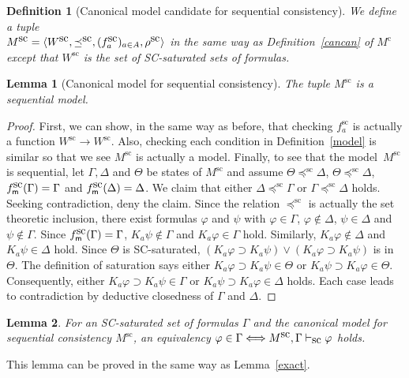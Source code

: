 \documentclass[doctor]{iscs-thesis}
\newcommand{\vdashsc}{\vdash_{\mbox{\rm sc}}}
\newcommand{\memory}{{\sf m}}
\newtheorem{definition}{Definition}
\newtheorem{lemma}{Lemma}
\begin{document}
\renewcommand{\canon}[1]{#1^{\mbox{sc}}}
\begin{definition}[Canonical model candidate for sequential consistency]
 We define a tuple\\ $\canon M =\model{^{\mbox{\rm sc}}}$ in the same
 way as Definition~\ref{cancan} of $M^{\mbox{c}}$ except that 
 $\canon W$ is the set of SC-saturated sets of formulas.
\end{definition}

\begin{lemma}[Canonical model for sequential consistency]
The tuple $\canon M$ is a sequential model.
\end{lemma}
\begin{proof}
First, we can show, in the same way as before,
 that checking $\canon f_a$ is actually a function $\canon
 W\rightarrow \canon W$.
Also, checking each condition in Definition~\ref{model} is similar so that we see $\canon
 M$ is actually a model.
 Finally, to see that the model~$\canon M$ is sequential,
 let $\Gamma, \Delta$ and $\Theta$ be states of $\canon M$ and assume
 $\Theta\canon\preceq\Delta$, $\Theta \canon\preceq \Delta$, $\canon f_\memory(\Gamma) = \Gamma$ and
 $\canon f_\memory(\Delta) = \Delta$.
 We claim that either $\Delta\canon\preceq \Gamma$ or $\Gamma\canon\preceq \Delta$ holds.
 Seeking contradiction, deny the claim.
 Since the relation $\canon \preceq$ is actually the set theoretic inclusion, there exist
 formulas $\varphi$ and $\psi$ with $\varphi\in\Gamma$, $\varphi\notin\Delta$, $\psi\in
 \Delta$ and $\psi\notin \Gamma$.
 Since $\canon f_\memory(\Gamma) = \Gamma$,
 $K_a\psi\notin\Gamma$ and $K_a\varphi\in \Gamma$ hold.
 Similarly,
 $K_a\varphi\notin\Delta$ and $K_a\psi\in\Delta$ hold.
 Since $\Theta$ is SC-saturated, $(K_a\varphi\supset K_a\psi)\vee (K_a\varphi\supset
 K_a\psi)$ is in $\Theta$.
 The definition of saturation says either
 $K_a\varphi\supset K_a\psi\in \Theta$ or
 $K_a\psi\supset K_a\varphi\in\Theta$.
 Consequently, either $K_a\varphi\supset K_a\psi\in\Gamma$ or
 $K_a\psi\supset K_a\varphi\in\Delta$ holds.
 Each case leads to contradiction by deductive closedness of $\Gamma$ and
 $\Delta$.
\end{proof}

\begin{lemma}
\label{sc-exact}
 For an SC-saturated set of formulas $\Gamma$ and the canonical model for sequential
 consistency
$\canon M$,
 an equivalency $\varphi\in\Gamma\Longleftrightarrow \canon M, \Gamma\vdashsc\varphi$ holds.
\end{lemma}
\noindent This lemma can be proved in the same way as Lemma~\ref{exact}.
\end{document}
